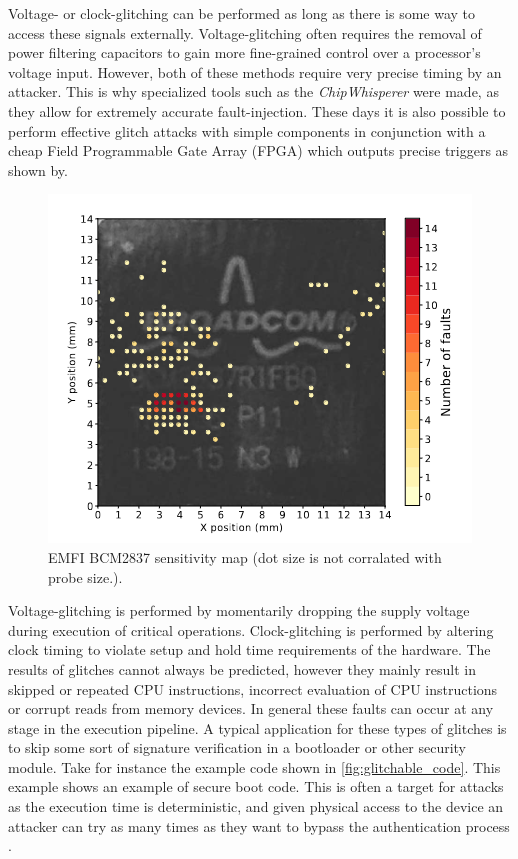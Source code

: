 Voltage- or clock-glitching can be performed as long as there is some way to access these signals externally. Voltage-glitching often requires the removal of power filtering capacitors to gain more fine-grained control over a processor's voltage input. However, both of these methods require very precise timing by an attacker. This is why specialized tools such as the \textit{ChipWhisperer}\cite{chipWhisperer} were made, as they allow for extremely accurate fault-injection. These days it is also possible to perform effective glitch attacks with simple components in conjunction with a cheap Field Programmable Gate Array (FPGA) which outputs precise triggers as shown by\cite{hole_in_soc}. 

\begin{figure}[h!]
    \centering
    \includegraphics[scale=0.5]{docs/images/emfi_error_map.png}
    \caption{EMFI BCM2837 sensitivity map (dot size is not corralated with probe size.)\cite{emfi_injection}.}
    \label{fig:emfi_map}
\end{figure}

Voltage-glitching is performed by momentarily dropping the supply voltage during execution of critical operations. Clock-glitching is performed by altering clock timing to violate setup and hold time requirements of the hardware\cite{intro_to_FI}. The results of glitches cannot always be predicted, however they mainly result in skipped or repeated CPU instructions, incorrect evaluation of CPU instructions or corrupt reads from memory devices\cite{intro_to_FI}. In general these faults can occur at any stage in the execution pipeline. A typical application for these types of glitches is to skip some sort of signature verification in a bootloader or other security module. Take for instance the example code shown in \autoref{fig:glitchable_code}. This example shows an example of secure boot code. This is often a target for attacks as the execution time is deterministic, and given physical access to the device an attacker can try as many times as they want to bypass the authentication process \cite{arm_presentation}. 

